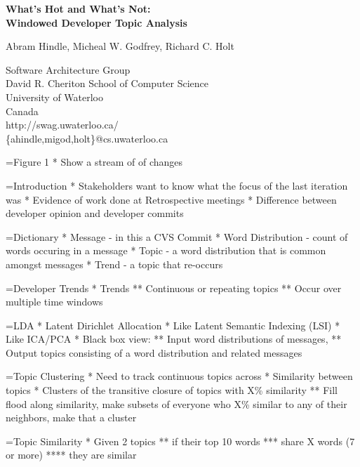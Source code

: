 \documentclass[titlepage,usenames,a4,landscape,semhelv]{seminar}
\author{
\names \\ 
{\small Software Architecture Group }\\
\small David R. Cheriton School of Computer Science\\
\small University of Waterloo\\
\small Canada\\
ahindle@cs.uwaterloo.ca
}
\newcommand{\gettitle}{What's Hot and What's Not:\\Windowed Developer Topic Analysis}
\newcommand{\gettitleproper}{\gettitle}
\newcommand{\names}{Abram Hindle, Micheal W. Godfrey, Richard C. Holt}
\begin{document}
\pagestyle{fancy} %
\begin{slide}

\begin{center}
{\bf \LARGE \gettitleproper }

{\names } 

{\small Software Architecture Group }\\[-.5em]
{\small David R. Cheriton School of Computer Science}\\[-.5em]
{\small University of Waterloo}\\[-.5em]
{\small Canada}\\[-.5em]
{\small http://swag.uwaterloo.ca/}\\
\{ahindle,migod,holt\}@cs.uwaterloo.ca


\end{center}

=Figure 1
* Show a stream of of changes

=Introduction
* Stakeholders want to know what the focus of the last iteration was
* Evidence of work done at Retrospective meetings
* Difference between developer opinion and developer commits


=Dictionary
* Message - in this a CVS Commit
* Word Distribution - count of words occuring in a message
* Topic - a word distribution that is common amongst messages
* Trend - a topic that re-occurs


=Developer Trends
* Trends
** Continuous or repeating topics
** Occur over multiple time windows

=LDA
* Latent Dirichlet Allocation
* Like Latent Semantic Indexing (LSI)
* Like ICA/PCA
* Black box view:
** Input word distributions of messages, 
** Output topics consisting of a word distribution and related messages



=Topic Clustering 
* Need to track continuous topics across 
* Similarity between topics
* Clusters of the transitive closure of topics with X\% similarity
** Fill flood along similarity, make subsets of everyone who X\% similar to any of their neighbors, make that a cluster




=Topic Similarity
* Given 2 topics
** if their top 10 words 
*** share X words (7 or more)
****  they are similar





\end{slide}
\end{document}
